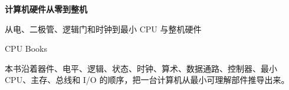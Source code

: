 \begin{titlepage}
\thispagestyle{empty}
\vspace*{2.25cm}
{\Huge\bfseries\color{BookNavy} 计算机硬件从零到整机\par}
\vspace{0.72cm}
{\Large\color{BookAccent} 从电、二极管、逻辑门和时钟到最小 CPU 与整机硬件\par}
\vspace{1.18cm}
{\large CPU Books\par}
\vfill
{\small\color{BookMuted} 本书沿着器件、电平、逻辑、状态、时钟、算术、数据通路、控制器、最小 CPU、主存、总线和 I/O 的顺序，把一台计算机从最小可理解部件推导出来。\par}
\end{titlepage}
